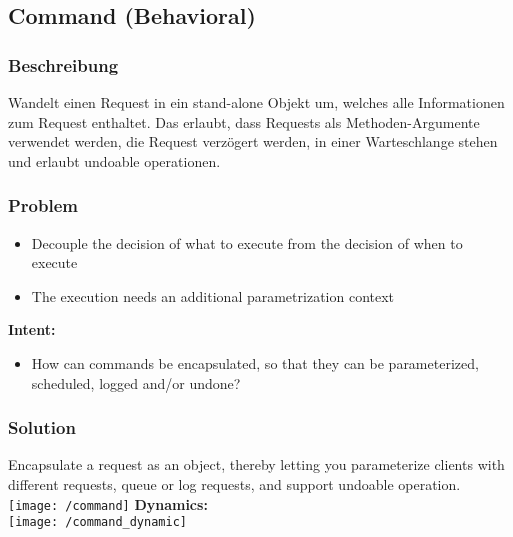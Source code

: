 \subsection{Command (Behavioral)}
\subsubsection{Beschreibung}
Wandelt einen Request in ein stand-alone Objekt um, welches alle Informationen zum Request enthaltet. Das erlaubt, dass Requests als Methoden-Argumente verwendet werden, die Request verzögert werden, in einer Warteschlange stehen und erlaubt undoable operationen.
\subsubsection{Problem}
\begin{itemize}[topsep=0pt]
    \itemsep -0.4em
    \item Decouple the decision of what to execute from the decision of when to execute
    \item The execution needs an additional parametrization context
\end{itemize}
\textbf{Intent:}
\begin{itemize}[topsep=0pt]
    \itemsep -0.4em
    \item How can commands be encapsulated, so that they can be parameterized, scheduled, logged and/or undone?
\end{itemize}
\subsubsection{Solution}
Encapsulate a request as an object, thereby letting you parameterize clients with different requests, queue or log requests, and support undoable operation.\\ 
\texttt{[image: /command]}
\textbf{Dynamics:}\\ 
\texttt{[image: /command\_dynamic]}
